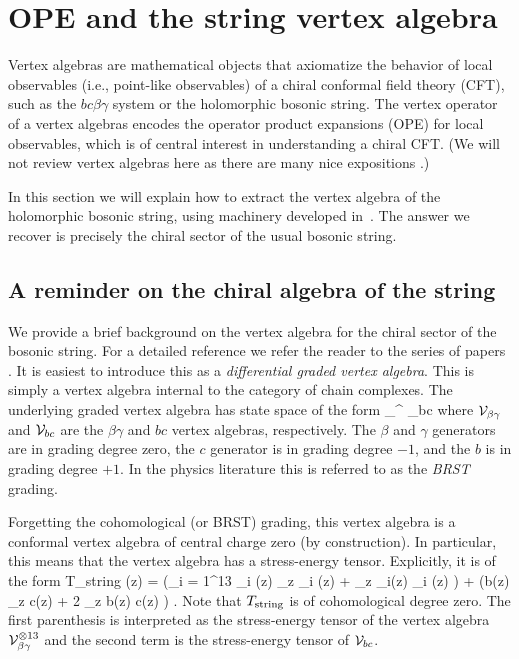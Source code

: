\section{OPE and the string vertex algebra}

Vertex algebras are mathematical objects that axiomatize the behavior of local observables 
(i.e., point-like observables) of a chiral conformal field theory (CFT),
such as the $bc\beta\gamma$ system or the holomorphic bosonic string.
The vertex operator of a vertex algebras encodes the operator product expansions (OPE) for local observables,
which is of central interest in understanding a chiral CFT.
(We will not review vertex algebras here
as there are many nice expositions \cite{FHL, BZF}.)

In this section we will explain how to extract the vertex algebra of the holomorphic bosonic string,
using machinery developed in~\cite{CG1,LiVA,GGW}.
The answer we recover is precisely the chiral sector of the usual bosonic string.

\subsection{A reminder on the chiral algebra of the string}\label{subsec: string vert}

We provide a brief background on the vertex algebra for the chiral sector of the bosonic string. 
For a detailed reference we refer the reader to the series of papers \cite{LZ1,LZ2}. 
It is easiest to introduce this as a {\em differential graded vertex algebra}. 
This is simply a vertex algebra internal to the category of chain complexes. 
The underlying graded vertex algebra has state space of the form
\ben
\cV_{\beta \gamma}^{} \tensor \cV_{bc}
\een
where $\mathcal{V}_{\beta\gamma}$ and $\mathcal{V}_{bc}$ are the $\beta\gamma$ and $bc$ vertex algebras, respectively. 
The $\beta$ and $\gamma$ generators are in grading degree zero, the $c$ generator is in grading degree $-1$, and the $b$ is in grading degree $+1$. 
In the physics literature this is referred to as the {\em BRST} grading.

Forgetting the cohomological (or BRST) grading, this vertex algebra is a conformal vertex algebra of central charge zero (by construction). 
In particular, this means that the vertex algebra has a stress-energy tensor. 
Explicitly, it is of the form
\ben
T_{\rm string} (z) = \left(\sum_{i = 1}^{13} \beta_i (z) \partial_z \gamma_i (z) + \partial_z \beta_i(z) \gamma_i (z) \right) + \left(b(z) \partial_z c(z) + 2 \partial_z b(z) c(z) \right) . 
\een
Note that $T_{\rm string}$ is of cohomological degree zero. 
The first parenthesis is interpreted as the stress-energy tensor of the vertex algebra $\mathcal{V}_{\beta \gamma}^{\otimes 13}$ and the second term is the stress-energy tensor of $\mathcal{V}_{bc}$. 

